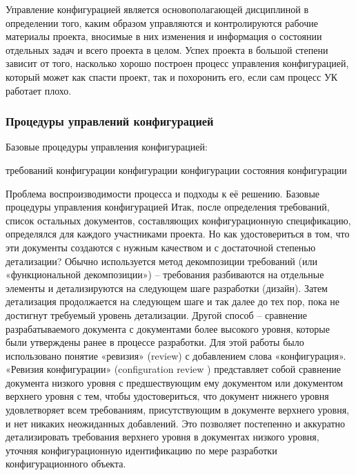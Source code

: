 \documentclass{../industrial-development}
\begin{document}
\lecturenotes
Управление конфигурацией является основополагающей дисциплиной в определении того, каким образом управляются и контролируются рабочие материалы проекта, вносимые в них изменения и информация о состоянии отдельных задач и всего проекта в целом. Успех проекта в большой степени зависит от того, насколько хорошо построен процесс управления конфигурацией, который может как спасти проект, так и похоронить его, если сам процесс УК работает плохо. 

\begin{frame} \frametitle{Процедуры управлений конфигурацией}
  \begin{block}{Базовые процедуры управления конфигурацией:}
  \begin{itemize}
 требований
 конфигурации
 конфигурации
 конфигурации
 состояния конфигурации
  \end{itemize}
	\end{block}
\end{frame}

\lecturenotes
Проблема воспроизводимости процесса и подходы к её решению. 
Базовые процедуры управления конфигурацией
Итак, после определения требований, список остальных документов, составляющих конфигурационную спецификацию, определялся для каждого участниками проекта. Но как удостовериться в том, что эти документы создаются с нужным качеством и с достаточной степенью детализации?
Обычно используется метод декомпозиции требований (или «функциональной декомпозиции») – требования разбиваются на отдельные элементы и детализируются на следующем шаге разработки (дизайн). Затем детализация продолжается на следующем шаге и так далее до тех пор, пока не достигнут требуемый уровень детализации.
Другой способ – сравнение разрабатываемого документа с документами более высокого уровня, которые были утверждены ранее в процессе разработки. Для этой работы было использовано понятие «ревизия» (review) с добавлением слова «конфигурация». «Ревизия конфигурации» (configuration review ) представляет собой сравнение документа низкого уровня с предшествующим ему документом или документом верхнего уровня с тем, чтобы удостовериться, что документ нижнего уровня удовлетворяет всем требованиям, присутствующим в документе верхнего уровня, и нет никаких неожиданных добавлений. Это позволяет постепенно и аккуратно детализировать требования верхнего уровня в документах низкого уровня, уточняя конфигурационную идентификацию по мере разработки конфигурационного объекта.
\end{document}
